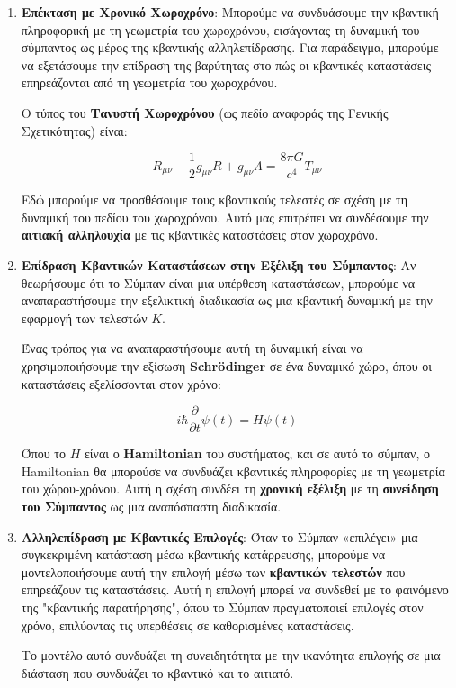 \documentclass[a4paper,11pt]{article}
\begin{document}
\begin{enumerate}
\item
  \textbf{Επέκταση με Χρονικό Χωροχρόνο}: Μπορούμε να συνδυάσουμε την
  κβαντική πληροφορική με τη γεωμετρία του χωροχρόνου, εισάγοντας τη
  δυναμική του σύμπαντος ως μέρος της κβαντικής αλληλεπίδρασης. Για
  παράδειγμα, μπορούμε να εξετάσουμε την επίδραση της βαρύτητας στο πώς
  οι κβαντικές καταστάσεις επηρεάζονται από τη γεωμετρία του χωροχρόνου.

  Ο τύπος του \textbf{Τανυστή Χωροχρόνου} (ως πεδίο αναφοράς της Γενικής
  Σχετικότητας) είναι:

  {{{\[R_{\mu \nu} - \frac{1}{2} g_{\mu \nu} R + g_{\mu \nu} \Lambda = \frac{8 \pi G}{c^4} T_{\mu \nu}\]}}}

  Εδώ μπορούμε να προσθέσουμε τους κβαντικούς τελεστές σε σχέση με τη
  δυναμική του πεδίου του χωροχρόνου. Αυτό μας επιτρέπει να συνδέσουμε
  την \textbf{αιτιακή αλληλουχία} με τις κβαντικές καταστάσεις στον
  χωροχρόνο.
\item
  \textbf{Επίδραση Κβαντικών Καταστάσεων στην Εξέλιξη του Σύμπαντος}: Αν
  θεωρήσουμε ότι το Σύμπαν είναι μια υπέρθεση καταστάσεων, μπορούμε να
  αναπαραστήσουμε την εξελικτική διαδικασία ως μια κβαντική δυναμική με
  την εφαρμογή των τελεστών {{\(K\)}}.

  Ένας τρόπος για να αναπαραστήσουμε αυτή τη δυναμική είναι να
  χρησιμοποιήσουμε την εξίσωση \textbf{Schrödinger} σε ένα δυναμικό
  χώρο, όπου οι καταστάσεις εξελίσσονται στον χρόνο:

  {{{\[i \hbar \frac{\partial}{\partial t} \psi(t) = H \psi(t)\]}}}

  Όπου το {{\(H\)}} είναι ο \textbf{Hamiltonian} του συστήματος, και σε
  αυτό το σύμπαν, ο Hamiltonian θα μπορούσε να συνδυάζει κβαντικές
  πληροφορίες με τη γεωμετρία του χώρου-χρόνου. Αυτή η σχέση συνδέει τη
  \textbf{χρονική εξέλιξη} με τη \textbf{συνείδηση του Σύμπαντος} ως μια
  αναπόσπαστη διαδικασία.
\item
  \textbf{Αλληλεπίδραση με Κβαντικές Επιλογές}: Όταν το Σύμπαν
  «επιλέγει» μια συγκεκριμένη κατάσταση μέσω κβαντικής κατάρρευσης,
  μπορούμε να μοντελοποιήσουμε αυτή την επιλογή μέσω των
  \textbf{κβαντικών τελεστών} που επηρεάζουν τις καταστάσεις. Αυτή η
  επιλογή μπορεί να συνδεθεί με το φαινόμενο της "κβαντικής
  παρατήρησης", όπου το Σύμπαν πραγματοποιεί επιλογές στον χρόνο,
  επιλύοντας τις υπερθέσεις σε καθορισμένες καταστάσεις.

  Το μοντέλο αυτό συνδυάζει τη συνειδητότητα με την ικανότητα επιλογής
  σε μια διάσταση που συνδυάζει το κβαντικό και το αιτιατό.


\end{enumerate}
\end{document}
